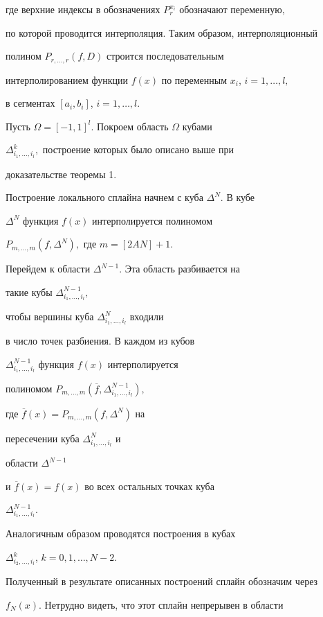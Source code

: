 где верхние индексы в обозначениях $P_r^{x_i}$ обозначают переменную,


по которой проводится интерполяция. Таким образом, интерполяционный


полином $P_{r,\dotsc,r}(f,D)$ строится последовательным


интерполированием функции $f(x)$ по переменным $x_i$, $i=1,\dotsc,l,$


в сегментах $[a_i,b_i]$, $i=1,\dotsc,l.$





Пусть $\Omega=[-1,1]^l.$ Покроем область $\Omega$ кубами


$\Delta^k_{i_1,\dotsc,i_l},$ построение которых было описано выше при


доказательстве теоремы 1.


Построение локального сплайна начнем с куба $\Delta^{N}.$ В кубе


$\Delta^{N}$ функция $f(x)$ интерполируется полиномом


$P_{m,\dotsc,m}(f,\Delta^{N}),$ где $m=[2AN]+1.$


Перейдем к области $\Delta^{N-1}.$ Эта область разбивается на


такие кубы $\Delta^{N-1}_{i_1,\dotsc, i_l},$


чтобы вершины куба $\Delta^{N}_{i_1,\dotsc, i_l}$ входили


в число точек разбиения. В каждом из кубов


$\Delta^{N-1}_{i_1,\dotsc,i_l}$ функция $f(x)$ интерполируется


полиномом $P_{m,\dotsc,m}(\overline f,\Delta^{N-1}_{i_1,\dotsc, i_l}),$


где $\overline f(x)=P_{m,\dotsc,m} (f,\Delta^{N})$ на


пересечении куба $\Delta^{N}_{i_1,\dotsc, i_l}$ и


области $\Delta^{N-1}$


и $\overline f(x)= f(x)$ во всех остальных точках куба


$\Delta^{N-1}_{i_1,\dotsc, i_l}.$


Аналогичным образом проводятся построения в кубах


$\Delta^{k}_{i_2,\dotsc, i_l}$, $k=0,1,\dotsc,N-2.$





Полученный в результате описанных построений сплайн обозначим через


$f_N(x).$ Нетрудно видеть, что этот сплайн непрерывен в области


